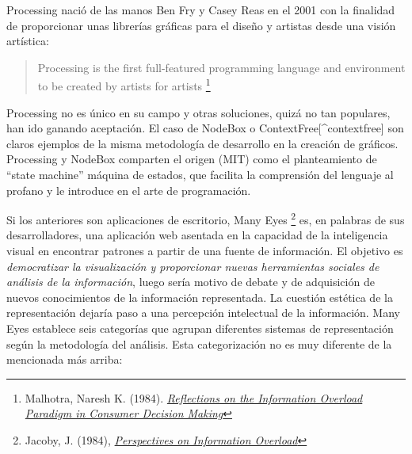 \documentclass[12pt, a4paper,twoside]{book}
\begin{document}
Processing nació de las manos Ben Fry y Casey Reas en el 2001 con
la finalidad de proporcionar unas librerías gráficas para el diseño
y artistas desde una visión artística:

\begin{quote}
Processing is the first full-featured programming language and
environment to be created by artists for artists%
\footnote{Malhotra, Naresh K. (1984).
\emph{\href{http://www.jstor.org/pss/2488913}{Reflections on the Information Overload Paradigm in Consumer Decision Making}}}

\end{quote}
Processing no es único en su campo y otras soluciones, quizá no tan
populares, han ido ganando aceptación. El caso de NodeBox o
ContextFree[\^{}contextfree] son claros ejemplos de la misma
metodología de desarrollo en la creación de gráficos. Processing y
NodeBox comparten el origen (MIT) como el planteamiento de
``state machine'' máquina de estados, que facilita la comprensión
del lenguaje al profano y le introduce en el arte de programación.

Si los anteriores son aplicaciones de escritorio, Many Eyes%
\footnote{Jacoby, J. (1984),
\emph{\href{http://www.jstor.org/pss/2488912}{Perspectives on Information Overload}}}
es, en palabras de sus desarrolladores, una aplicación web asentada
en la capacidad de la inteligencia visual en encontrar patrones a
partir de una fuente de información. El objetivo es
\emph{democratizar la visualización y proporcionar nuevas herramientas sociales de análisis de la información},
luego sería motivo de debate y de adquisición de nuevos
conocimientos de la información representada. La cuestión estética
de la representación dejaría paso a una percepción intelectual de
la información. Many Eyes establece seis categorías que agrupan
diferentes sistemas de representación según la metodología del
análisis. Esta categorización no es muy diferente de la mencionada
más arriba:
\end{document}
